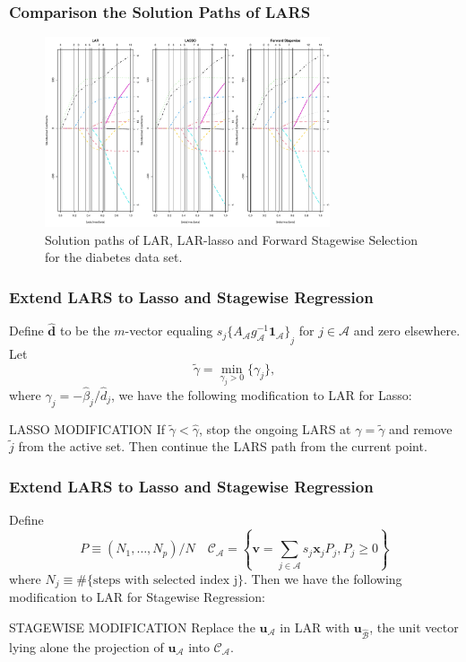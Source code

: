 \begin{frame}
    \frametitle{Comparison the Solution Paths of LARS}
\begin{figure}[!htbp]
    \begin{center}
        \includegraphics[width=0.75\textwidth]{img/lars_diabetes.pdf}
    \end{center}
    \caption{Solution paths of LAR, LAR-lasso and Forward Stagewise Selection for the diabetes data set.}\label{fig:lars_diabetes}
\end{figure}
\end{frame}

\begin{frame}
\frametitle{Extend LARS to Lasso and Stagewise Regression}
Define $\hat{\mathbf{d}}$ to be the $m$-vector equaling $s_j{ \{A_\mathcal{A} g^{-1}_\mathcal{A} \mathbf{1}_\mathcal{A}\}}_j$ for $j\in\mathcal{A}$ and zero elsewhere. Let $$\tilde{\gamma}=\min_{\gamma_j>0}\{\gamma_j\},$$ where $\gamma_j=-\hat{\beta}_j/\hat{d}_j$, we have the following modification to LAR for Lasso:

\begin{block}{LASSO MODIFICATION}
If $\tilde{\gamma}<\hat{\gamma}$, stop the ongoing LARS at $\gamma=\tilde{\gamma}$ and remove $\tilde{j}$ from the active set. Then continue the LARS path from the current point.
\end{block}
\end{frame}

\begin{frame}
\frametitle{Extend LARS to Lasso and Stagewise Regression}

Define
$$P\equiv(N_1,\dots,N_p)/N \quad \mathcal{C}_{\mathcal{A}}=\left\{\mathbf{v}=\sum_{j\in\mathcal{A}}s_j \mathbf{x}_j P_j, P_j\geq 0\right\}$$ 
where $N_j\equiv \#\{\text{steps with selected index j}\}$. Then we have the following modification to LAR for Stagewise Regression:

\begin{block}{STAGEWISE MODIFICATION}
Replace the $\mathbf{u}_{\mathcal{A}}$ in LAR with $\mathbf{u}_{\hat{\mathcal{B}}}$, the unit vector lying alone the projection of $\mathbf{u}_{\mathcal{A}}$ into $\mathcal{C}_{\mathcal{A}}$.
\end{block}
\end{frame}


